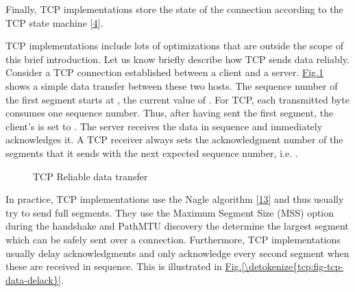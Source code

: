 \documentclass[letterpaper,10pt,english]{sphinxmanual}
\begin{document}
\sphinxAtStartPar
Finally, TCP implementations store the state of the connection according to the TCP state machine {[}\hyperlink{cite.biblio:id729}{4}{]}.

\sphinxAtStartPar
TCP implementations include lots of optimizations that are outside the scope of this brief introduction. Let us know briefly describe how TCP sends data reliably. Consider a TCP connection established between a client and a server. \hyperref[\detokenize{tcp:fig-tcp-simple-data}]{Fig.\@ \ref{\detokenize{tcp:fig-tcp-simple-data}}} shows a simple data transfer between these two hosts. The sequence number of the first segment starts at , the current value of . For TCP, each transmitted byte consumes one sequence number. Thus, after having sent the first segment, the client’s  is set to .  The server receives the data in sequence and immediately acknowledges it. A TCP receiver always sets the acknowledgment number of the segments that it sends with the next expected sequence number, i.e. .
\begin{figure}[htbp]\centering\capstart{}\caption{TCP Reliable data transfer}\label{\detokenize{tcp:id7}}\label{\detokenize{tcp:fig-tcp-simple-data}}\end{figure}
\sphinxAtStartPar
In practice, TCP implementations use the Nagle algorithm {[}\hyperlink{cite.biblio:id831}{13}{]} and thus usually try to send full segments. They use the Maximum Segment Size (MSS) option during the handshake and PathMTU discovery the determine the largest segment which can be safely sent over a connection. Furthermore, TCP implementations usually delay acknowledgments and only acknowledge every second segment when these are received in sequence. This is illustrated in \hyperref[\detokenize{tcp:fig-tcp-data-delack}]{Fig.\@ \ref{\detokenize{tcp:fig-tcp-data-delack}}}.
\end{document}
